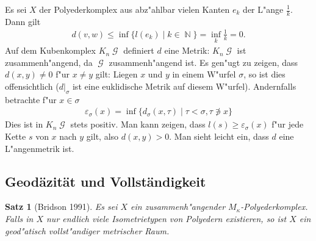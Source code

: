 \documentclass[paper=A4, twoside, chapterprefix=true, bibliography=totoc, headsepline]{scrbook}
\let\temp\phi
\let\phi\varphi
\let\varphi\temp
\let\temp\theta
\let\theta\vartheta
\let\vartheta\temp
\let\temp\epsilon
\let\epsilon\varepsilon
\let\varepsilon\temp
\let\temp\rho
\let\rho\varrho
\let\varrho\temp
\DeclareMathOperator{\N}{\mathbb{N}}
\DeclareMathOperator{\calG}{{\mathcal{G}}}
\newcommand{\G}{\calG}
\theoremstyle{break}
\theoremstyle{nonumberbreak}
\newtheorem{satz}{Satz}
\theoremstyle{emptybreak}
\theoremstyle{break}
\begin{document}
Es sei $X$ der Polyederkomplex aus abz"ahlbar vielen Kanten $e_k$ der L"ange $\frac{1}{k}$.
Dann gilt
\begin{align*}
	d(v, w) \le \inf \{ l(e_k) \mid k \in \N \} = \inf_k \frac{1}{k} = 0.
\end{align*}
Auf dem Kubenkomplex $K_n\G$ definiert $d$ eine Metrik:
$K_n\G$ ist zusammenh"angend, da $\G$ zusammenh"angend ist.
Es gen"ugt zu zeigen, dass $d(x,y) \ne 0$ f"ur $x \ne y$ gilt:
Liegen $x$ und $y$ in einem W"urfel $\sigma$, so ist dies offensichtlich ($d|_\sigma$ ist eine euklidische Metrik auf diesem W"urfel).
Andernfalls betrachte f"ur $x \in \sigma$
\begin{align*}
	\epsilon_\sigma(x) = \inf \{ d_\sigma(x, \tau) \mid \tau < \sigma, \tau \not\ni x \}
\end{align*}
Dies ist in $K_n\G$ stets positiv.
Man kann zeigen, dass $l(s) \ge \epsilon_\sigma(x)$ f"ur jede Kette $s$ von $x$ nach $y$ gilt, also $d(x, y) > 0$.
Man sieht leicht ein, dass $d$ eine L"angenmetrik ist.

\subsection*{Geod\"azit\"at und Vollst\"andigkeit}
\begin{satz}[Bridson 1991]
Es sei $X$ ein zusammenh"angender $M_\kappa$-Polyederkomplex.
Falls in $X$ nur endlich viele Isometrietypen von Polyedern existieren, so ist $X$ ein geod"atisch vollst"andiger metrischer Raum.
\end{satz}
\end{document}
